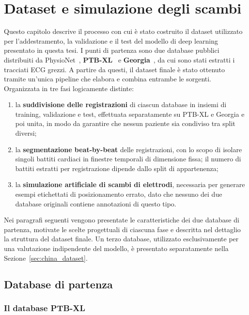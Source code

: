 \chapter{Dataset e simulazione degli scambi}
\label{chap_5}
Questo capitolo descrive il processo con cui è stato costruito il dataset utilizzato per l'addestramento, la validazione e il test del modello di deep learning presentato in questa tesi. I punti di partenza sono due database pubblici distribuiti da PhysioNet~\cite{goldberger2000physionet}, \textbf{PTB-XL}~\cite{wagner2020ptbxl} e \textbf{Georgia}~\cite{alday2020georgia}, da cui sono stati estratti i tracciati ECG grezzi. A partire da questi, il dataset finale è stato ottenuto tramite un'unica pipeline che elabora e combina entrambe le sorgenti. Organizzata in tre fasi logicamente distinte:

\begin{enumerate}
	\item la \textbf{suddivisione delle registrazioni} di ciascun database in insiemi di training, validazione e test, effettuata separatamente su PTB-XL e Georgia e poi unita, in modo da garantire che nessun paziente sia condiviso tra split diversi;
	\item la \textbf{segmentazione beat-by-beat} delle registrazioni, con lo scopo di isolare singoli battiti cardiaci in finestre temporali di dimensione fissa; il numero di battiti estratti per registrazione dipende dallo split di appartenenza;
	\item la \textbf{simulazione artificiale di scambi di elettrodi}, necessaria per generare esempi etichettati di posizionamento errato, dato che nessuno dei due database originali contiene annotazioni di questo tipo.
\end{enumerate}

Nei paragrafi seguenti vengono presentate le caratteristiche dei due database di partenza, motivate le scelte progettuali di ciascuna fase e descritta nel dettaglio la struttura del dataset finale. Un terzo database, utilizzato esclusivamente per una valutazione indipendente del modello, è presentato separatamente nella Sezione~\ref{sec:china_dataset}.

\section{Database di partenza}

\subsection{Il database PTB-XL}

